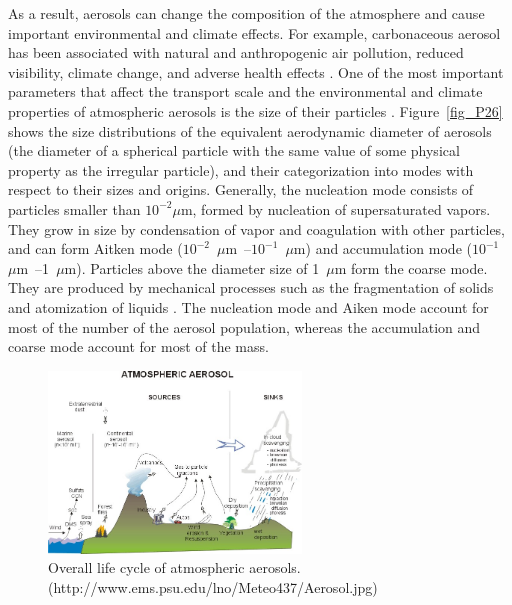 \documentclass[12pt, fullpage]{uiucthesis2009}
\begin{document}
	As a result, aerosols can change the composition of the atmosphere and cause important environmental and climate effects. For example, carbonaceous aerosol has been associated with natural and anthropogenic air pollution, reduced visibility, climate change, and adverse health effects \citep{Mauderly2008}. One of the most important parameters that affect the transport scale and the environmental and climate properties of atmospheric aerosols is the size of their particles \citep{Pacyna1995}. Figure~\ref{fig_P26} shows the size distributions of the equivalent aerodynamic diameter of aerosols (the diameter of a spherical particle with the same value of some physical property as the irregular particle), and their categorization into modes with respect to their sizes and origins. Generally, the nucleation mode consists of particles smaller than $10^{-2}\mu$m, formed by nucleation of supersaturated vapors. They grow in size by condensation of vapor and coagulation with other particles, and can form Aitken mode ($10^{-2}$~$\mu$m~--$10^{-1}$~$\mu$m) and accumulation mode ($10^{-1}$~$\mu$m~--1~$\mu$m). Particles above the diameter size of 1~$\mu$m form the coarse mode. They are produced by mechanical processes such as the fragmentation of solids and atomization of liquids \citep{Pacyna1995,kulmala2004}.
	The nucleation mode and Aiken mode account for most of the number of the aerosol population, whereas the accumulation and coarse mode account for most of the mass. 
	
	\begin{figure}[h] 
		\begin{center}
			\includegraphics[width = 0.6\textwidth]{Figure25}
			\caption[Overall life cycle of atmospheric aerosols]{\label{fig_P25} Overall life cycle of atmospheric aerosols. (http://www.ems.psu.edu/lno/Meteo437/Aerosol.jpg)}
		\end{center}
	\end{figure}
	
\end{document}
